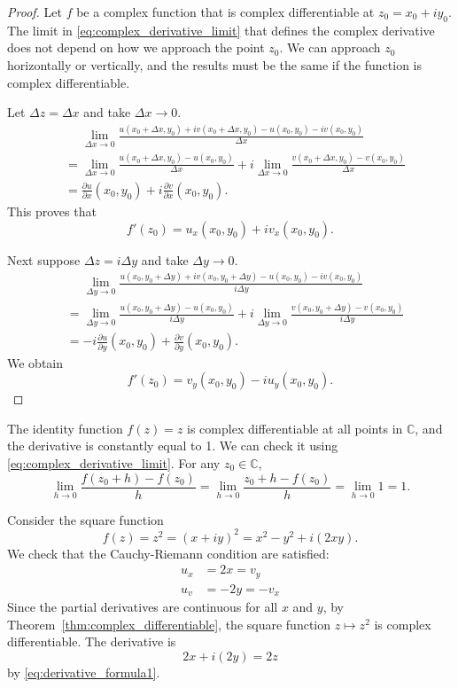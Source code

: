 \begin{proof}
	Let $f$ be a complex function that is complex differentiable at $z_0 = x_0+iy_0$. The limit in \eqref{eq:complex_derivative_limit} that defines the complex derivative does not depend on how we approach the point $z_0$. We can approach $z_0$ horizontally or vertically, and the results must be the same if the function is complex differentiable. 

	Let $\Delta z= \Delta x$ and take $\Delta x\rightarrow0$.
	\begin{align*}
		& \phantom{=} \lim_{\Delta x\rightarrow 0} \frac{u(x_0+\Delta x,y_0)+iv(x_0+\Delta x,y_0)-u(x_0,y_0)-iv(x_0,y_0)}{\Delta x} \\
		&=\lim_{\Delta x\rightarrow 0} \frac{u(x_0+\Delta x,y_0)-u(x_0,y_0)}{\Delta x}
		+ i\lim_{\Delta x\rightarrow 0} \frac{v(x_0+\Delta x,y_0)-v(x_0,y_0)}{\Delta x} \\ 
		&= \frac{\partial u}{\partial x}(x_0,y_0) + i \frac{\partial v}{\partial x}(x_0,y_0).
	\end{align*}
This proves that $$f'(z_0) = 	u_x(x_0,y_0) + i v_x(x_0,y_0).$$
	
	Next suppose $\Delta z= i \Delta y$ and take $\Delta y\rightarrow0$.
	\begin{align*}
		& \phantom{=} \lim_{\Delta y\rightarrow 0} \frac{u(x_0,y_0+\Delta y)+iv(x_0,y_0+\Delta y)-u(x_0,y_0)-iv(x_0,y_0)}{i \Delta y} \\
		&=\lim_{\Delta y\rightarrow 0} \frac{u(x_0,y_0+\Delta y )-u(x_0,y_0)}{i \Delta y}
		+ i\lim_{\Delta y\rightarrow 0} \frac{v(x_0,y_0+\Delta y)-v(x_0,y_0)}{i \Delta y} \\ 
		&= - i\frac{\partial u}{\partial y}(x_0,y_0) +  \frac{\partial v}{\partial y}(x_0,y_0).
	\end{align*}
We obtain
$$
f'(z_0) = 	v_y(x_0,y_0) - i u_y(x_0,y_0).
$$
\end{proof}	


\begin{example}
The identity function $f(z)=z$ is complex differentiable at all points in $\mathbb{C}$, and the derivative is constantly equal to 1.  We can check it using \eqref{eq:complex_derivative_limit}. For any $z_0\in\mathbb{C}$,
$$
 \lim_{h\rightarrow 0} \frac{f(z_0+h)-f(z_0)}{h} = 
 \lim_{h\rightarrow 0}  \frac{z_0+h-f(z_0)}{h} = \lim_{h\rightarrow 0} 1 = 1.
$$
\end{example}

\begin{example}
Consider the square function 
$$f(z)=z^2 = (x+iy)^2 = x^2-y^2 +i (2xy).
$$
We check that the Cauchy-Riemann condition are satisfied:
\begin{align*}
	u_x &= 2x = v_y \\
	u_v &= -2y = -v_x 
\end{align*}
Since the partial derivatives are continuous for all $x$ and $y$, by Theorem~\ref{thm:complex_differentiable}, the square function $z\mapsto z^2$ is complex differentiable. The derivative is
$$ 
2x + i (2y) = 2z
$$
by \eqref{eq:derivative_formula1}. \label{ex:holomorphic_example3}
\end{example}

